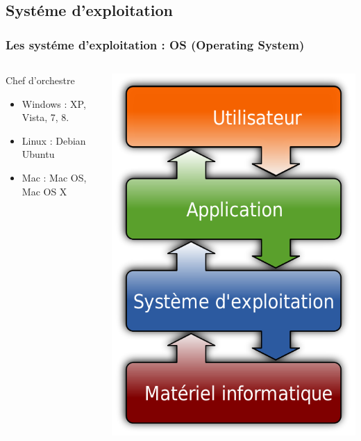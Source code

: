 \documentclass{beamer}
\begin{document}
	\subsection{Systéme d'exploitation}
	\begin{frame}
		\frametitle{Les systéme d'exploitation : OS (Operating System)}
		\begin{columns}
			\begin{column}[l]{5cm}
				\begin{block}{Chef d'orchestre}
					\begin{itemize}
						\item Windows : XP, Vista, 7, 8.
						\item Linux : Debian Ubuntu
						\item Mac : Mac OS, Mac OS X
					\end{itemize}
				\end{block}
			\end{column}
			\begin{column}[l]{5cm}
				\includegraphics[scale=0.25]{image/OS.png}
			\end{column}
		\end{columns}
	\end{frame}
\end{document}
